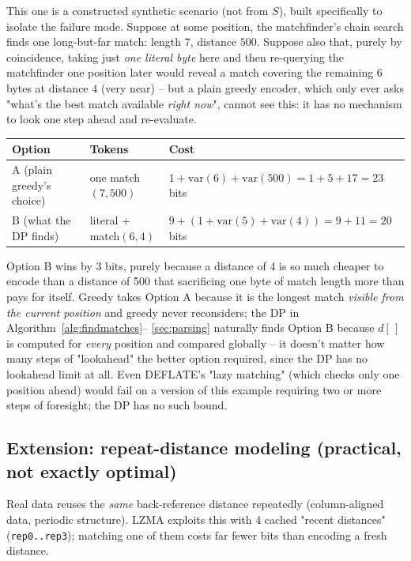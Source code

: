 \documentclass[11pt]{article}
\begin{document}
\begin{tcolorbox}[colback=orange!5!white,colframe=orange!70!black,title=Worked counterexample: where plain greedy actually loses]
This one is a constructed synthetic scenario (not from $S$), built specifically to
isolate the failure mode. Suppose at some position, the matchfinder's chain search finds
one long-but-far match: length $7$, distance $500$. Suppose also that, purely by
coincidence, taking just \emph{one literal byte} here and then re-querying the
matchfinder one position later would reveal a match covering the remaining 6 bytes at
distance $4$ (very near) -- but a plain greedy encoder, which only ever asks "what's the
best match available \emph{right now}", cannot see this: it has no mechanism to look
one step ahead and re-evaluate.
\begin{center}
\begin{tabular}{@{}lll@{}}
\toprule
Option & Tokens & Cost \\
\midrule
A (plain greedy's choice) & one match$(7, 500)$ & $1 + \text{var}(6) + \text{var}(500) = 1+5+17 = 23$ bits \\
B (what the DP finds) & literal $+$ match$(6, 4)$ & $9 + (1+\text{var}(5)+\text{var}(4)) = 9+11 = 20$ bits \\
\bottomrule
\end{tabular}
\end{center}
Option B wins by 3 bits, purely because a distance of 4 is so much cheaper to encode than
a distance of 500 that sacrificing one byte of match length more than pays for itself.
Greedy takes Option A because it is the longest match \emph{visible from the current
position} and greedy never reconsiders; the DP in Algorithm~\ref{alg:findmatches}--%
\ref{sec:parsing} naturally finds Option B because $d[\,]$ is computed for
\emph{every} position and compared globally -- it doesn't matter how many steps of
"lookahead" the better option required, since the DP has no lookahead limit at all. Even
DEFLATE's "lazy matching" (which checks only one position ahead) would fail on a version
of this example requiring two or more steps of foresight; the DP has no such bound.
\end{tcolorbox}

\subsection{Extension: repeat-distance modeling (practical, not exactly optimal)}
\label{sec:repdist}

Real data reuses the \emph{same} back-reference distance repeatedly (column-aligned
data, periodic structure). LZMA exploits this with 4 cached "recent distances"
(\texttt{rep0..rep3}); matching one of them costs far fewer bits than encoding a fresh
distance.
\end{document}

